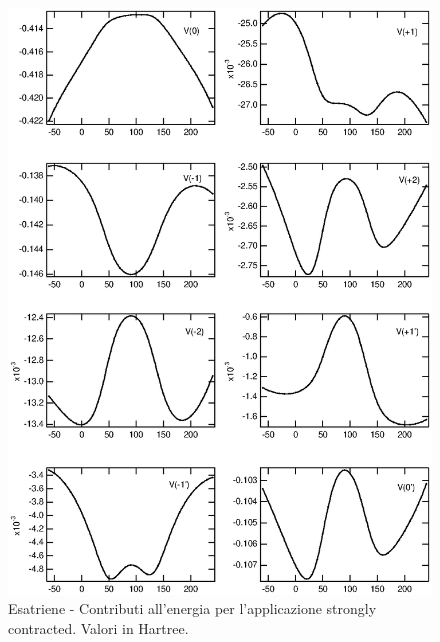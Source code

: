 \begin{figure}[ht]
\begin{center}
\includegraphics[angle=0,width=14cm,keepaspectratio]{immagini/esatriene/energie_sc.eps}
\caption{\small Esatriene - Contributi all'energia per l'applicazione
strongly contracted. Valori in Hartree. }
\label{fig:esatriene_energie_sc}
\end{center}
\end{figure}
\pagebreak
